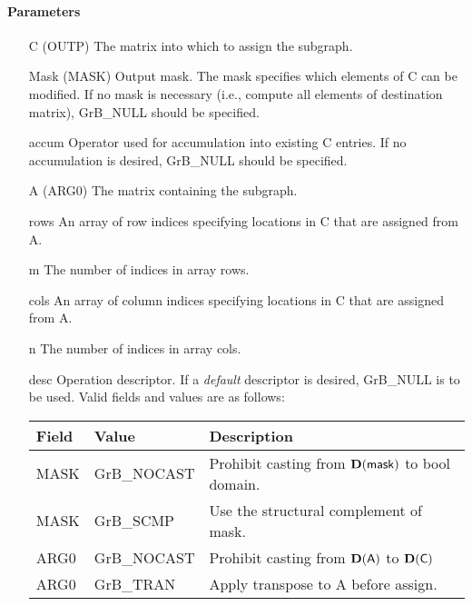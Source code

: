 \paragraph{Parameters}

\begin{itemize}[leftmargin=1.1in]
    \item[{\sf C}]      ({\sf OUTP}) The matrix into which to assign the subgraph.
    \item[{\sf Mask}]   ({\sf MASK}) Output mask. The mask specifies which elements
    of {\sf C} can be modified. If no mask is necessary (i.e., compute all
    elements of destination matrix), {\sf GrB\_NULL} should be specified.
    \item[{\sf accum}]  Operator used for accumulation into existing {\sf C} entries.  If no accumulation
                        is desired, {\sf GrB\_NULL} should be specified.
    \item[{\sf A}]      ({\sf ARG0}) The matrix containing the subgraph.
    \item[{\sf rows}]   An array of row indices specifying locations in {\sf C} that
                        are assigned from {\sf A}. 
    \item[{\sf m}]      The number of indices in array {\sf rows}.
    \item[{\sf cols}]   An array of column indices 
                        specifying locations in {\sf C} that are assigned from {\sf A}.
    \item[{\sf n}]      The number of indices in array {\sf cols}.
    \item[{\sf desc}]   Operation descriptor. If a
    \emph{default} descriptor is desired, {\sf GrB\_NULL} is to be
    used. Valid fields and values are as follows: \\
    \begin{tabular}{lll}
    Field  & Value & Description \\
    \hline
    {\sf MASK} & {\sf GrB\_NOCAST} & Prohibit casting from $\bold{D}({\sf mask})$ to {\sf bool} domain. \\
    {\sf MASK} & {\sf GrB\_SCMP} & Use the structural complement of {\sf mask}. \\
    {\sf ARG0} & {\sf GrB\_NOCAST} & Prohibit casting from $\bold{D}({\sf A})$ to $\bold{D}({\sf C})$ \\
    {\sf ARG0} & {\sf GrB\_TRAN} & Apply transpose to {\sf A} before assign. \\
    \end{tabular}
\end{itemize}

